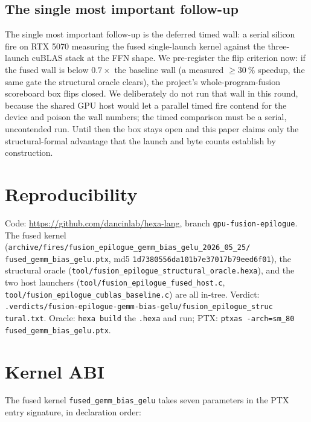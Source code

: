\documentclass[11pt,a4paper]{article}
\begin{document}
\subsection{The single most important follow-up}

The single most important follow-up is the deferred timed wall: a serial
silicon fire on RTX 5070 measuring the fused single-launch kernel against the
three-launch cuBLAS stack at the FFN shape. We pre-register the
flip criterion now: if the fused wall is below $0.7\times$ the baseline wall
(a measured $\geq\SI{30}{\percent}$ speedup, the same gate the structural
oracle clears), the project's whole-program-fusion scoreboard box flips
closed. We deliberately do not run that wall in this round, because the shared
GPU host would let a parallel timed fire contend for the device and poison the
wall numbers; the timed comparison must be a serial, uncontended run. Until
then the box stays open and this paper claims only the structural-formal
advantage that the launch and byte counts establish by construction.

\section*{Reproducibility}

Code: \url{https://github.com/dancinlab/hexa-lang}, branch
\texttt{gpu-fusion-epilogue}. The fused kernel
(\texttt{archive/fires/fusion\_epilogue\_gemm\_bias\_gelu\_2026\_05\_25/%
fused\_gemm\_bias\_gelu.ptx}, md5 \texttt{1d7380556da101b7e37017b79eed6f01}),
the structural oracle (\texttt{tool/fusion\_epilogue\_structural\_oracle.hexa}),
and the two host launchers (\texttt{tool/fusion\_epilogue\_fused\_host.c},
\texttt{tool/fusion\_epilogue\_cublas\_baseline.c}) are all in-tree. Verdict:
\texttt{.verdicts/fusion-epilogue-gemm-bias-gelu/fusion\_epilogue\_struc%
tural.txt}. Oracle: \texttt{hexa build} the \texttt{.hexa} and run; PTX:
\texttt{ptxas -arch=sm\_80 fused\_gemm\_bias\_gelu.ptx}.

\appendix

\section{Kernel ABI}
\label{app:abi}

The fused kernel \texttt{fused\_gemm\_bias\_gelu} takes seven parameters in the
PTX entry signature, in declaration order:
\end{document}
